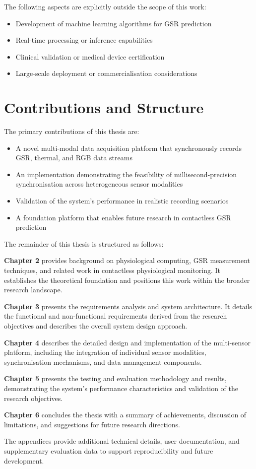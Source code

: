 The following aspects are explicitly outside the scope of this work:

\begin{itemize}
\item Development of machine learning algorithms for GSR prediction
\item Real-time processing or inference capabilities
\item Clinical validation or medical device certification
\item Large-scale deployment or commercialisation considerations
\end{itemize}

\section{Contributions and Structure}

The primary contributions of this thesis are:

\begin{itemize}
\item A novel multi-modal data acquisition platform that synchronously records GSR, thermal, and RGB data streams
\item An implementation demonstrating the feasibility of millisecond-precision synchronisation across heterogeneous sensor modalities
\item Validation of the system's performance in realistic recording scenarios
\item A foundation platform that enables future research in contactless GSR prediction
\end{itemize}

The remainder of this thesis is structured as follows:

\textbf{Chapter 2} provides background on physiological computing, GSR measurement techniques, and related work in contactless physiological monitoring. It establishes the theoretical foundation and positions this work within the broader research landscape.

\textbf{Chapter 3} presents the requirements analysis and system architecture. It details the functional and non-functional requirements derived from the research objectives and describes the overall system design approach.

\textbf{Chapter 4} describes the detailed design and implementation of the multi-sensor platform, including the integration of individual sensor modalities, synchronisation mechanisms, and data management components.

\textbf{Chapter 5} presents the testing and evaluation methodology and results, demonstrating the system's performance characteristics and validation of the research objectives.

\textbf{Chapter 6} concludes the thesis with a summary of achievements, discussion of limitations, and suggestions for future research directions.

The appendices provide additional technical details, user documentation, and supplementary evaluation data to support reproducibility and future development.
